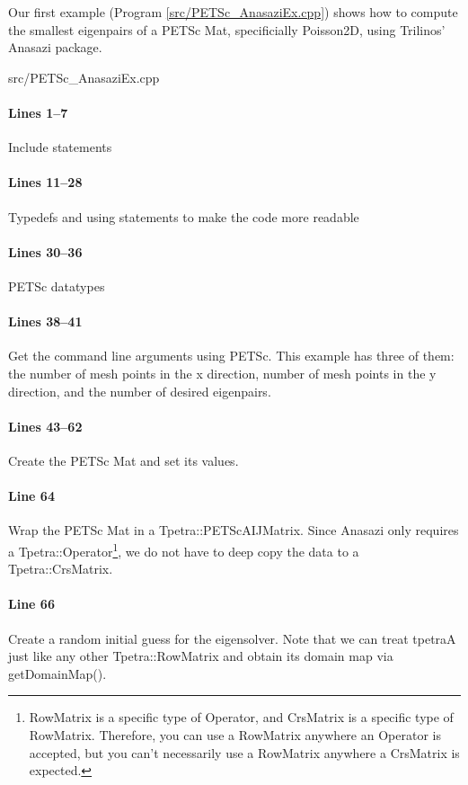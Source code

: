 Our first example (Program \ref{src/PETSc_AnasaziEx.cpp}) shows how to compute
the smallest eigenpairs of a PETSc Mat, specificially Poisson2D, using Trilinos'
Anasazi package.

\begin{lstinputlisting}[caption=PETSc\_AnasaziEx.cpp,label=PETSc_AnasaziEx.cpp]{src/PETSc_AnasaziEx.cpp}
\end{lstinputlisting}

\paragraph{Lines 1--7}
Include statements

\paragraph{Lines 11--28}
Typedefs and using statements to make the code more readable

\paragraph{Lines 30--36}
PETSc datatypes

\paragraph{Lines 38--41}
Get the command line arguments using PETSc.  This example has three of them: the
number of mesh points in the x direction, number of mesh points in the y
direction, and the number of desired eigenpairs.

\paragraph{Lines 43--62}
Create the PETSc Mat and set its values.

\paragraph{Line 64}
Wrap the PETSc Mat in a Tpetra::PETScAIJMatrix.  Since Anasazi only requires a
Tpetra::Operator\footnote{RowMatrix is a specific type of Operator, and
CrsMatrix is a specific type of RowMatrix.  Therefore, you can use a RowMatrix
anywhere an Operator is accepted, but you can't necessarily use a RowMatrix
anywhere a CrsMatrix is expected.}, we do not have to deep copy the data to a
Tpetra::CrsMatrix.

\paragraph{Line 66}
Create a random initial guess for the eigensolver.  Note that we can treat
tpetraA just like any other Tpetra::RowMatrix and obtain its domain map via
getDomainMap().